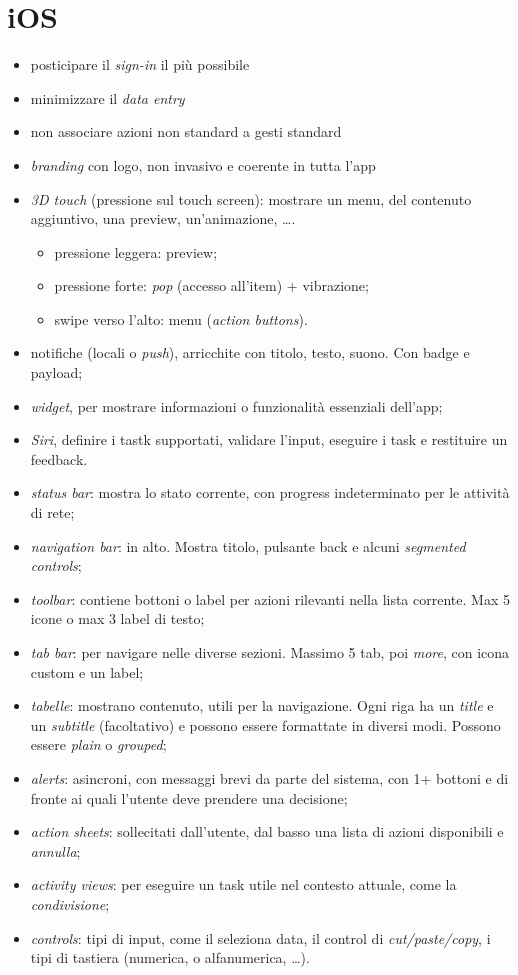 \section{iOS}
\begin{itemize}
	\item posticipare il \textit{sign-in} il pi\`u possibile
	\item minimizzare il \textit{data entry}
	\item non associare azioni non standard a gesti standard
	\item \textit{branding} con logo, non invasivo e coerente in tutta l'app
	\item \textit{3D touch} (pressione sul touch screen): mostrare un menu, del contenuto aggiuntivo, una preview, un'animazione, \ldots.
	\begin{itemize}
		\item pressione leggera: preview;
		\item pressione forte: \textit{pop} (accesso all'item) + vibrazione;
		\item swipe verso l'alto: menu (\textit{action buttons}).
	\end{itemize}
	\item notifiche (locali o \textit{push}), arricchite con titolo, testo, suono. Con badge e payload;
	\item \textit{widget}, per mostrare informazioni o funzionalit\`a essenziali dell'app;
	\item \textit{Siri}, definire i tastk supportati, validare l'input, eseguire i task e restituire un feedback.
	\item \textit{status bar}: mostra lo stato corrente, con progress indeterminato per le attivit\`a di rete;
	\item \textit{navigation bar}: in alto. Mostra titolo, pulsante back e alcuni \textit{segmented controls};
	\item \textit{toolbar}: contiene bottoni o label per azioni rilevanti nella lista corrente. Max 5 icone o max 3 label di testo;
	\item \textit{tab bar}: per navigare nelle diverse sezioni. Massimo 5 tab, poi \textit{more}, con icona custom e un label;
	\item \textit{tabelle}: mostrano contenuto, utili per la navigazione. Ogni riga ha un \textit{title} e un \textit{subtitle} (facoltativo) e possono essere formattate in diversi modi. Possono essere \textit{plain} o \textit{grouped};
	\item \textit{alerts}: asincroni, con messaggi brevi da parte del sistema, con 1+ bottoni e di fronte ai quali l'utente deve prendere una decisione;
	\item \textit{action sheets}: sollecitati dall'utente, dal basso una lista di azioni disponibili e \textit{annulla};
	\item \textit{activity views}: per eseguire un task utile nel contesto attuale, come la \textit{condivisione};
	\item \textit{controls}: tipi di input, come il seleziona data, il control di \textit{cut/paste/copy}, i tipi di tastiera (numerica, o alfanumerica, \ldots).
\end{itemize}